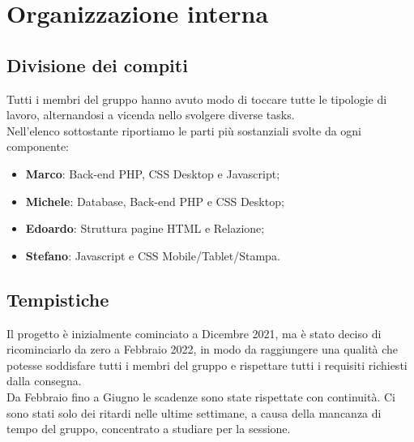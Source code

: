 \section{Organizzazione interna}
    \subsection{Divisione dei compiti}
    Tutti i membri del gruppo hanno avuto modo di toccare tutte le tipologie di lavoro, alternandosi a vicenda nello svolgere diverse tasks.\\
    Nell'elenco sottostante riportiamo le parti più sostanziali svolte da ogni componente:
    \begin{itemize}
        \item \textbf{Marco}: Back-end PHP, CSS Desktop e Javascript;
        \item \textbf{Michele}: Database, Back-end PHP e CSS Desktop;
        \item \textbf{Edoardo}: Struttura pagine HTML e Relazione;
        \item \textbf{Stefano}: Javascript e CSS Mobile/Tablet/Stampa.
    \end{itemize}
    
    \subsection{Tempistiche}
    Il progetto è inizialmente cominciato a Dicembre 2021, ma è stato deciso di ricominciarlo da zero a Febbraio 2022, in modo da raggiungere una qualità che potesse soddisfare tutti i membri del gruppo e rispettare tutti i requisiti richiesti dalla consegna.\\
    Da Febbraio fino a Giugno le scadenze sono state rispettate con continuità. Ci sono stati solo dei ritardi nelle ultime settimane, a causa della mancanza di tempo del gruppo, concentrato a studiare per la sessione. 
